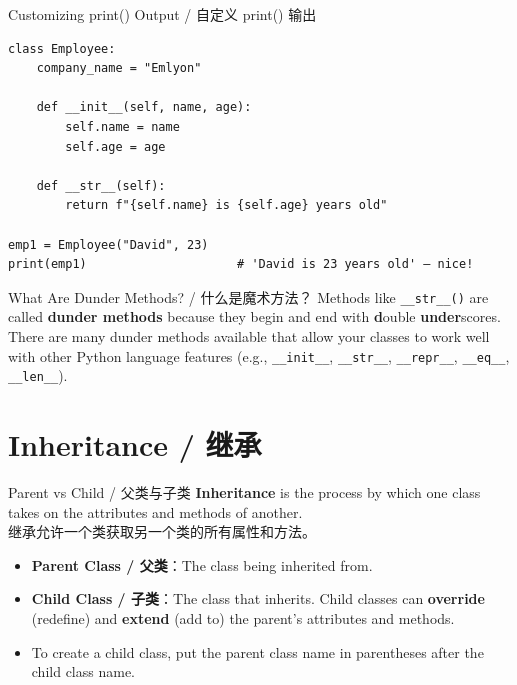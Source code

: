 \documentclass[11pt,a4paper]{report}
\let\oldtexttt\texttt
\renewcommand{\texttt}[1]{\textcolor{mainblue}{\oldtexttt{#1}}}
\begin{document}
\begin{examplebox}{Customizing print() Output / 自定义 print() 输出}
\begin{lstlisting}
class Employee:
    company_name = "Emlyon"

    def __init__(self, name, age):
        self.name = name
        self.age = age

    def __str__(self):
        return f"{self.name} is {self.age} years old"

emp1 = Employee("David", 23)
print(emp1)                     # 'David is 23 years old' — nice!
\end{lstlisting}
\end{examplebox}

\begin{concept}{What Are Dunder Methods? / 什么是魔术方法？}
    Methods like \texttt{\_\_str\_\_()} are called \textbf{dunder methods} because they begin and end with \textbf{d}ouble \textbf{under}scores. There are many dunder methods available that allow your classes to work well with other Python language features (e.g., \texttt{\_\_init\_\_}, \texttt{\_\_str\_\_}, \texttt{\_\_repr\_\_}, \texttt{\_\_eq\_\_}, \texttt{\_\_len\_\_}).
\end{concept}

\section{Inheritance / 继承}

\begin{concept}{Parent vs Child / 父类与子类}
    \textbf{Inheritance} is the process by which one class takes on the attributes and methods of another. \\
    继承允许一个类获取另一个类的所有属性和方法。

    \begin{itemize}[itemsep=0.5em]
        \item \textbf{Parent Class / 父类}：The class being inherited from.
        \item \textbf{Child Class / 子类}：The class that inherits. Child classes can \textbf{override} (redefine) and \textbf{extend} (add to) the parent's attributes and methods.
        \item To create a child class, put the parent class name in parentheses after the child class name.
    \end{itemize}
\end{concept}
\end{document}

